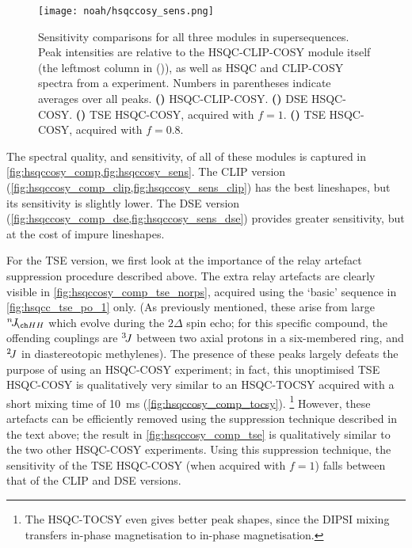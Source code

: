 \begin{figure}[!ht]
    \centering
    \texttt{[image: noah/hsqccosy\_sens.png]}%
    {\label{fig:hsqccosy_sens_clip}}%
    {\label{fig:hsqccosy_sens_dse}}%
    {\label{fig:hsqccosy_sens_tse_1}}%
    {\label{fig:hsqccosy_sens_tse_0p8}}%
    \caption[Sensitivity comparisons for  supersequences]{
        Sensitivity comparisons for all three modules in  supersequences.
        Peak intensities are relative to the HSQC-CLIP-COSY module itself (the leftmost column in ()), as well as HSQC and CLIP-COSY spectra from a  experiment.
        Numbers in parentheses indicate averages over all peaks.
        \textbf{()} HSQC-CLIP-COSY.
        \textbf{()} DSE HSQC-COSY.
        \textbf{()} TSE HSQC-COSY, acquired with $f = 1$.
        \textbf{()} TSE HSQC-COSY, acquired with $f = 0.8$.
    }
    \label{fig:hsqccosy_sens}
\end{figure}

The spectral quality, and sensitivity, of all of these modules is captured in \cref{fig:hsqccosy_comp,fig:hsqccosy_sens}.
The CLIP version (\cref{fig:hsqccosy_comp_clip,fig:hsqccosy_sens_clip}) has the best lineshapes, but its sensitivity is slightly lower.
The DSE version (\cref{fig:hsqccosy_comp_dse,fig:hsqccosy_sens_dse}) provides greater sensitivity, but at the cost of impure lineshapes.

For the TSE version, we first look at the importance of the relay artefact suppression procedure described above.
The extra relay artefacts are clearly visible in \cref{fig:hsqccosy_comp_tse_norps}, acquired using the `basic' sequence in \cref{fig:hsqcc_tse_po_1} only.
(As previously mentioned, these arise from large $\nJ{HH}$ which evolve during the $2\Delta$ spin echo; for this specific compound, the offending couplings are $^3\!J\/$ between two axial protons in a six-membered ring, and $^2\!J\/$ in diastereotopic methylenes).
The presence of these peaks largely defeats the purpose of using an HSQC-COSY experiment; in fact, this unoptimised TSE HSQC-COSY is qualitatively very similar to an HSQC-TOCSY acquired with a short mixing time of \qty{10}{\ms} (\cref{fig:hsqccosy_comp_tocsy}).%
\footnote{The HSQC-TOCSY even gives better peak shapes, since the DIPSI mixing transfers in-phase magnetisation to in-phase magnetisation.}
However, these artefacts can be efficiently removed using the suppression technique described in the text above; the result in \cref{fig:hsqccosy_comp_tse} is qualitatively similar to the two other HSQC-COSY experiments.
Using this suppression technique, the sensitivity of the TSE HSQC-COSY (when acquired with $f = 1$) falls between that of the CLIP and DSE versions.

